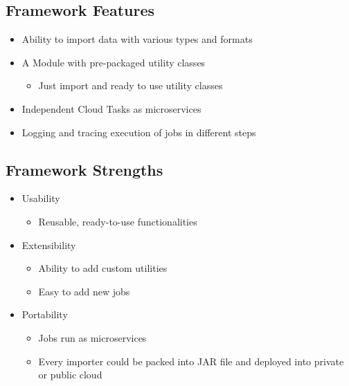 \subsection{Framework Features}\label{framework-features}

\begin{itemize}
\tightlist
\item
  Ability to import data with various types and formats
\item
  A Module with pre-packaged utility classes

  \begin{itemize}
  \tightlist
  \item
    Just import and ready to use utility classes
  \end{itemize}
\item
  Independent Cloud Tasks as microservices
\item
  Logging and tracing execution of jobs in different steps
\end{itemize}

\subsection{Framework Strengths}\label{framework-strengths}

\begin{itemize}
\tightlist
\item
  Usability

  \begin{itemize}
  \tightlist
  \item
    Reusable, ready-to-use functionalities
  \end{itemize}
\item
  Extensibility

  \begin{itemize}
  \tightlist
  \item
    Ability to add custom utilities
  \item
    Easy to add new jobs
  \end{itemize}
\item
  Portability

  \begin{itemize}
  \tightlist
  \item
    Jobs run as microservices
  \item
    Every importer could be packed into JAR file and deployed into
    private or public cloud
  \end{itemize}
\end{itemize}

